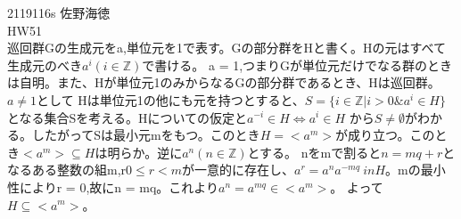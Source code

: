 \documentclass[11pt]{article}
\begin{document}
2119116s 佐野海徳\\
HW51\\
巡回群Gの生成元をa,単位元を1で表す。Gの部分群をHと書く。Hの元はすべて生成元のべき$a^i(i \in \mathbb{Z})$で書ける。
a = 1,つまりGが単位元だけでなる群のときは自明。また、Hが単位元1のみからなるGの部分群であるとき、Hは巡回群。$a \neq 1$として
Hは単位元1の他にも元を持つとすると、$S = \{i \in \mathbb{Z} | i > 0 \& a^i \in H\}$となる集合Sを考える。Hについての仮定と$a^{-i} \in H \Leftrightarrow a^i \in H$
から$S \neq \emptyset$がわかる。したがってSは最小元mをもつ。このとき$H = <a^m>$が成り立つ。このとき$<a^m> \subseteq H$は明らか。逆に$a^n(n \in \mathbb{Z})$とする。
nをmで割ると$n = mq + r$となるある整数の組m,r$0 \leq r < m$が一意的に存在し、$a^r = a^n a^{-mq} \ in H$。mの最小性によりr = 0,故にn = mq。これより$a^n = a^{mq} \in <a^m>$。
よって$H \subseteq <a^m>$。
\end{document}
